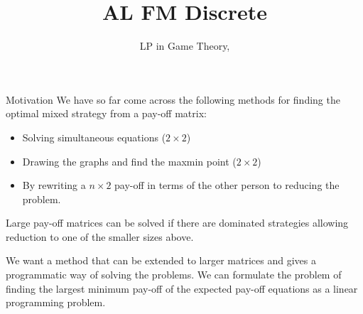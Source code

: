\documentclass[8pt]{beamer}
\title[Pure]{{\color{aa}\Huge\adfbullet{9}}AL FM Discrete}
\subtitle{LP in Game Theory, \textattachfile{LPinGameTheory.tex}{(TeX)}}
\begin{document}
\frame{\titlepage}

\setlength{\abovedisplayskip}{0pt}
\setlength{\belowdisplayskip}{0pt}
\setlength{\abovedisplayshortskip}{0pt}
\setlength{\belowdisplayshortskip}{0pt}

\begin{frame}{Motivation}
	We have so far come across the following methods for finding the optimal mixed strategy from a pay-off matrix:
\begin{itemize}
	\item Solving simultaneous equations ($2 \times 2$)
	\item Drawing the graphs and find the maxmin point  ($2 \times 2$)
    \item By rewriting a $n \times 2$ pay-off in terms of the other person to reducing the problem.
\end{itemize}
Large pay-off matrices can be solved if there are dominated strategies allowing reduction to one of the smaller sizes above.

\alert{We want a method that can be extended to larger matrices and gives a programmatic way of solving the problems. We can formulate the problem of finding the largest minimum pay-off of the expected pay-off equations as a linear programming problem. }

\end{frame}
\end{document}
